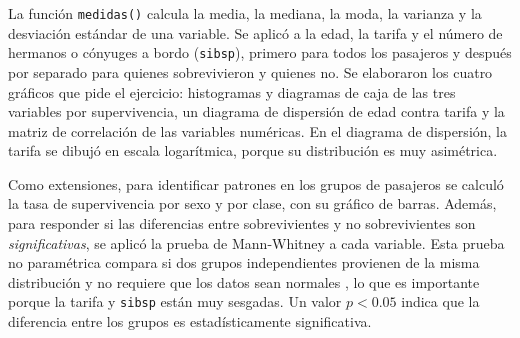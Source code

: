 \documentclass[11pt,letterpaper]{article}
\begin{document}
La función \texttt{medidas()} calcula la media, la mediana, la moda, la varianza y la desviación estándar de una variable. Se aplicó a la edad, la tarifa y el número de hermanos o cónyuges a bordo (\texttt{sibsp}), primero para todos los pasajeros y después por separado para quienes sobrevivieron y quienes no. Se elaboraron los cuatro gráficos que pide el ejercicio: histogramas y diagramas de caja de las tres variables por supervivencia, un diagrama de dispersión de edad contra tarifa y la matriz de correlación de las variables numéricas. En el diagrama de dispersión, la tarifa se dibujó en escala logarítmica, porque su distribución es muy asimétrica.

Como extensiones, para identificar patrones en los grupos de pasajeros se calculó la tasa de supervivencia por sexo y por clase, con su gráfico de barras. Además, para responder si las diferencias entre sobrevivientes y no sobrevivientes son \textit{significativas}, se aplicó la prueba de Mann-Whitney a cada variable. Esta prueba no paramétrica compara si dos grupos independientes provienen de la misma distribución y no requiere que los datos sean normales \parencite{tecnm2026_documento_fuente}, lo que es importante porque la tarifa y \texttt{sibsp} están muy sesgadas. Un valor $p < 0.05$ indica que la diferencia entre los grupos es estadísticamente significativa.
\end{document}
